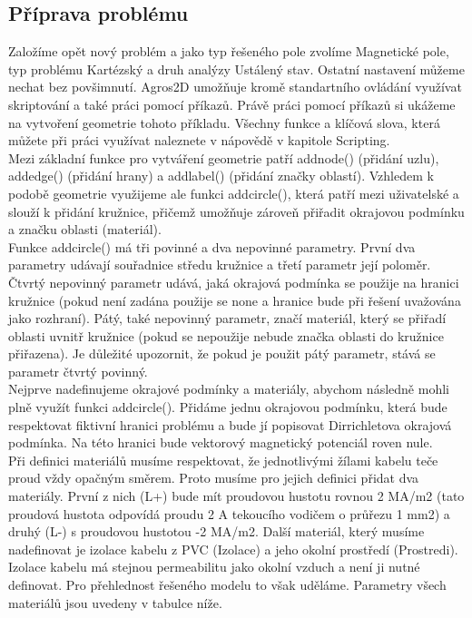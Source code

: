 \documentclass[a4paper, oneside]{article}
\begin{document}
\subsection{Příprava problému}
Založíme opět nový problém a jako typ řešeného pole zvolíme Magnetické pole, typ problému Kartézský a druh analýzy Ustálený stav. Ostatní nastavení můžeme nechat bez povšimnutí. Agros2D umožňuje kromě standartního ovládání využívat skriptování a také práci pomocí příkazů. Právě práci pomocí příkazů si ukážeme na vytvoření geometrie tohoto příkladu. Všechny funkce a klíčová slova, která můžete při práci využívat naleznete v nápovědě v kapitole Scripting.\\
Mezi základní funkce pro vytváření geometrie patří addnode() (přidání uzlu), addedge() (přidání hrany) a addlabel() (přidání značky oblastí). Vzhledem k podobě geometrie využijeme ale funkci addcircle(), která patří mezi uživatelské a slouží k přidání kružnice, přičemž umožňuje zároveň přiřadit okrajovou podmínku a značku oblasti (materiál).\\
Funkce addcircle() má tři povinné a dva nepovinné parametry. První dva parametry udávají souřadnice středu kružnice a třetí parametr její poloměr. Čtvrtý nepovinný parametr udává, jaká okrajová podmínka se použije na hranici kružnice (pokud není zadána použije se none a hranice bude při řešení uvažována jako rozhraní). Pátý, také nepovinný parametr, značí materiál, který se přiřadí oblasti uvnitř kružnice (pokud se nepoužije nebude značka oblasti do kružnice přiřazena). Je důležité upozornit, že pokud je použit pátý parametr, stává se parametr čtvrtý povinný.\\
Nejprve nadefinujeme okrajové podmínky a materiály, abychom následně mohli plně využít funkci addcircle(). Přidáme jednu okrajovou podmínku, která bude respektovat fiktivní hranici problému a bude jí popisovat Dirrichletova okrajová podmínka. Na této hranici bude vektorový magnetický potenciál roven nule.\\
Při definici materiálů musíme respektovat, že jednotlivými žílami kabelu teče proud vždy opačným směrem. Proto musíme pro jejich definici přidat dva materiály. První z nich (L+) bude mít proudovou hustotu rovnou 2 MA/m2 (tato proudová hustota odpovídá proudu 2 A tekoucího vodičem o průřezu 1 mm2) a druhý (L-) s proudovou hustotou -2 MA/m2. Další materiál, který musíme nadefinovat je izolace kabelu z PVC (Izolace) a jeho okolní prostředí (Prostredi). Izolace kabelu má stejnou permeabilitu jako okolní vzduch a není ji nutné definovat. Pro přehlednost řešeného modelu to však uděláme. Parametry všech materiálů jsou uvedeny v tabulce níže.\\
\end{document}
